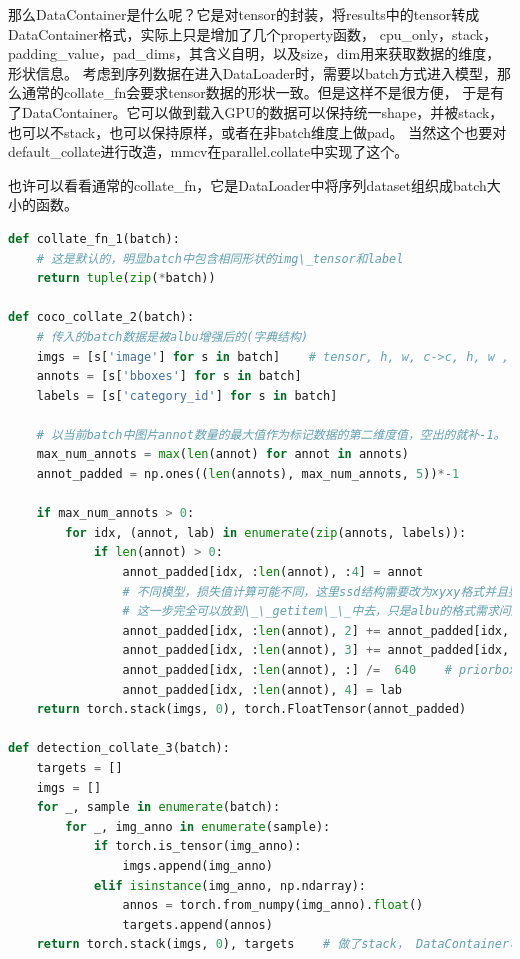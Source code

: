 \documentclass[UTF8]{ctexart}
\begin{document}
那么DataContainer是什么呢？它是对tensor的封装，将results中的tensor转成DataContainer格式，实际上只是增加了几个property函数，
cpu\_only，stack，padding\_value，pad\_dims，其含义自明，以及size，dim用来获取数据的维度，形状信息。
考虑到序列数据在进入DataLoader时，需要以batch方式进入模型，那么通常的collate\_fn会要求tensor数据的形状一致。但是这样不是很方便，
于是有了DataContainer。它可以做到载入GPU的数据可以保持统一shape，并被stack，也可以不stack，也可以保持原样，或者在非batch维度上做pad。
当然这个也要对default\_collate进行改造，mmcv在parallel.collate中实现了这个。

也许可以看看通常的collate\_fn，它是DataLoader中将序列dataset组织成batch大小的函数。

\lstset{style=mystyle}
\begin{lstlisting}[language=Python]
def collate_fn_1(batch):
	# 这是默认的，明显batch中包含相同形状的img\_tensor和label
	return tuple(zip(*batch))
	
def coco_collate_2(batch):
	# 传入的batch数据是被albu增强后的(字典结构)
    imgs = [s['image'] for s in batch]    # tensor, h, w, c->c, h, w , handle at transform in __getitem__
    annots = [s['bboxes'] for s in batch]
    labels = [s['category_id'] for s in batch]

	# 以当前batch中图片annot数量的最大值作为标记数据的第二维度值，空出的就补-1。
    max_num_annots = max(len(annot) for annot in annots)
    annot_padded = np.ones((len(annots), max_num_annots, 5))*-1

    if max_num_annots > 0:
        for idx, (annot, lab) in enumerate(zip(annots, labels)):
            if len(annot) > 0:
                annot_padded[idx, :len(annot), :4] = annot
				# 不同模型，损失值计算可能不同，这里ssd结构需要改为xyxy格式并且要做尺度归一化
				# 这一步完全可以放到\_\_getitem\_\_中去，只是albu的格式需求问题。
                annot_padded[idx, :len(annot), 2] += annot_padded[idx, :len(annot), 0]    #  xywh-->x1,y1,x2,y2 for general box,ssd target assigner
                annot_padded[idx, :len(annot), 3] += annot_padded[idx, :len(annot), 1]    # contains padded -1 label
                annot_padded[idx, :len(annot), :] /=  640    # priorbox for ssd primary target assinger
                annot_padded[idx, :len(annot), 4] = lab
	return torch.stack(imgs, 0), torch.FloatTensor(annot_padded)
	
def detection_collate_3(batch):
    targets = []
    imgs = []
    for _, sample in enumerate(batch):
        for _, img_anno in enumerate(sample):
            if torch.is_tensor(img_anno):
                imgs.append(img_anno)
            elif isinstance(img_anno, np.ndarray):
                annos = torch.from_numpy(img_anno).float()
                targets.append(annos)
    return torch.stack(imgs, 0), targets    # 做了stack， DataContainer可以不做stack
\end{lstlisting}
\end{document}
